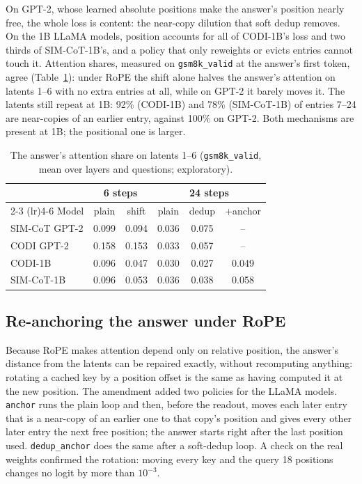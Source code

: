 \documentclass[11pt]{article}
\newcommand{\pol}[1]{\texttt{#1}}
\begin{document}
On GPT-2, whose learned absolute positions make the answer's position nearly free, the whole loss is content: the
near-copy dilution that soft dedup removes. On the 1B LLaMA models, position accounts for all of CODI-1B's loss and two
thirds of SIM-CoT-1B's, and a policy that only reweights or evicts entries cannot touch it. Attention shares, measured on
\texttt{gsm8k\_valid} at the answer's first token, agree (Table~\ref{tab:attention}): under RoPE the shift alone halves the
answer's attention on latents 1--6 with no extra entries at all, while on GPT-2 it barely moves it. The latents still repeat
at 1B: 92\% (CODI-1B) and 78\% (SIM-CoT-1B) of entries 7--24 are near-copies of an earlier entry, against 100\% on GPT-2. Both
mechanisms are present at 1B; the positional one is larger.

\begin{table}[t]
\centering
\small
\setlength{\tabcolsep}{3pt}
\begin{tabular}{lccccc}
\toprule
& \multicolumn{2}{c}{6 steps} & \multicolumn{3}{c}{24 steps} \\
\cmidrule(lr){2-3} \cmidrule(lr){4-6}
Model & plain & shift & plain & dedup & +anchor \\
\midrule
SIM-CoT GPT-2 & 0.099 & 0.094 & 0.036 & 0.075 & -- \\
CODI GPT-2 & 0.158 & 0.153 & 0.033 & 0.057 & -- \\
CODI-1B & 0.096 & 0.047 & 0.030 & 0.027 & 0.049 \\
SIM-CoT-1B & 0.096 & 0.053 & 0.036 & 0.038 & 0.058 \\
\bottomrule
\end{tabular}
\caption{The answer's attention share on latents 1--6 (\texttt{gsm8k\_valid}, mean over layers and questions; exploratory).}
\label{tab:attention}
\end{table}

\subsection{Re-anchoring the answer under RoPE}
\label{sec:anchoring}

Because RoPE makes attention depend only on relative position, the answer's distance from the latents can be repaired
exactly, without recomputing anything: rotating a cached key by a position offset is the same as having computed it at the
new position. The amendment added two policies for the LLaMA models. \pol{anchor} runs the plain loop and then, before the
readout, moves each later entry that is a near-copy of an earlier one to that copy's position and gives every other later
entry the next free position; the answer starts right after the last position used. \pol{dedup\_anchor} does the same after
a soft-dedup loop. A check on the real weights confirmed the rotation: moving every key and the query 18 positions changes
no logit by more than $10^{-3}$.
\end{document}
